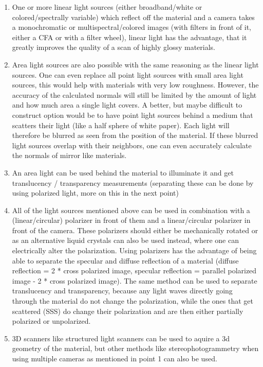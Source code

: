 \documentclass[11pt, twoside, listof=totocnumbered, bibliography=totocnumbered]{scrartcl}
\begin{document}
\begin{enumerate}
	\item One or more linear light sources (either broadband/white or colored/spectrally variable) which reflect off the material and a camera takes a monochromatic or multispectral/colored images (with filters in front of it, either a CFA or with a filter wheel), linear light has the advantage, that it greatly improves the quality of a scan of highly glossy materials. \cite{LINEAR_LIGHT}
	\item Area light sources are also possible with the same reasoning as the linear light sources. One can even replace all point light sources with small area light sources, this would help with materials with very low roughness. However, the accuracy of the calculated normals will still be limited by the amount of light and how much area a single light covers. A better, but maybe difficult to construct option would be to have point light sources behind a medium that scatters their light (like a half sphere of white paper). Each light will therefore be blurred as seen from the position of the material. If these blurred light sources overlap with their neighbors, one can even accurately calculate the normals of mirror like materials. \cite{PS_AreaLights}
	\item An area light can be used behind the material to illuminate it and get translucency / transparency measurements (separating these can be done by using polarized light, more on this in the next point)
	\item All of the light sources mentioned above can be used in combination with a (linear/circular) polarizer in front of them and a linear/circular polarizer in front of the camera. These polarizers should either be mechanically rotated or as an alternative liquid crystals can also be used instead, where one can electrically alter the polarization. Using polarizers has the advantage of being able to separate the specular and diffuse reflection of a material (diffuse reflection = 2 * cross polarized image, specular reflection = parallel polarized image - 2 * cross polarized image). The same method can be used to separate translucency and transparency, because any light waves directly going through the material do not change the polarization, while the ones that get scattered (SSS) do change their polarization and are then either partially polarized or unpolarized.	
	\item 3D scanners like structured light scanners can be used to aquire a 3d geometry of the material, but other methods like stereophotogrammetry when using multiple cameras as mentioned in point 1 can also be used.

\end{enumerate}
\end{document}

